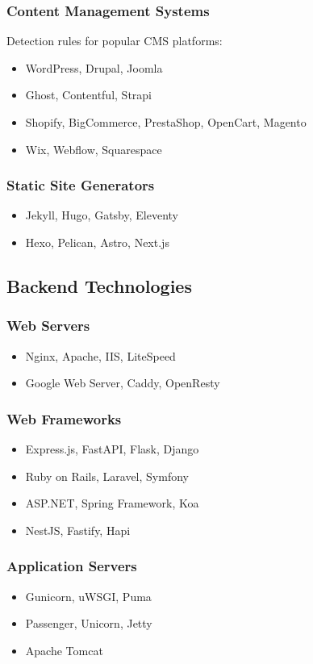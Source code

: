 \documentclass[11pt,a4paper,oneside]{article}
\begin{document}
\subsubsection{Content Management Systems}
Detection rules for popular CMS platforms:
\begin{itemize}
    \item WordPress, Drupal, Joomla
    \item Ghost, Contentful, Strapi
    \item Shopify, BigCommerce, PrestaShop, OpenCart, Magento
    \item Wix, Webflow, Squarespace
\end{itemize}

\subsubsection{Static Site Generators}
\begin{itemize}
    \item Jekyll, Hugo, Gatsby, Eleventy
    \item Hexo, Pelican, Astro, Next.js
\end{itemize}

\subsection{Backend Technologies}
\subsubsection{Web Servers}
\begin{itemize}
    \item Nginx, Apache, IIS, LiteSpeed
    \item Google Web Server, Caddy, OpenResty
\end{itemize}

\subsubsection{Web Frameworks}
\begin{itemize}
    \item Express.js, FastAPI, Flask, Django
    \item Ruby on Rails, Laravel, Symfony
    \item ASP.NET, Spring Framework, Koa
    \item NestJS, Fastify, Hapi
\end{itemize}

\subsubsection{Application Servers}
\begin{itemize}
    \item Gunicorn, uWSGI, Puma
    \item Passenger, Unicorn, Jetty
    \item Apache Tomcat
\end{itemize}
\end{document}
